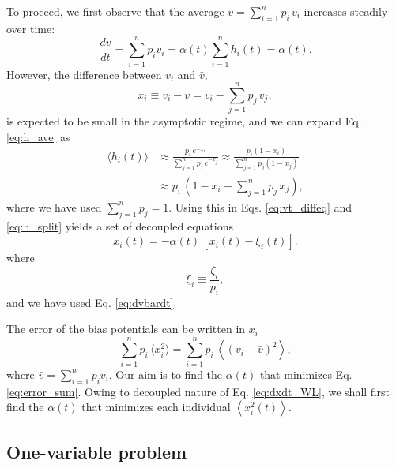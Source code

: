 \documentclass[reprint]{revtex4-1}
\begin{document}
To proceed, we first observe that
the average $\bar v = \sum_{i = 1}^n p_i \, v_i$
increases steadily over time:
%
\begin{equation}
\frac{ d \bar v } { d t }
=
\sum_{i = 1}^n p_i \dot v_i
=
\alpha(t) \sum_{i = 1}^n h_i(t) = \alpha(t).
\label{eq:dvbardt}
\end{equation}
%
However, the difference between $v_i$ and $\bar v$,
%
\begin{equation}
  x_i \equiv v_i - \bar v = v_i - \sum_{j = 1}^n p_j \, v_j,
  \label{eq:x_def}
\end{equation}
%
is expected to be small in the asymptotic regime,
and we can expand Eq. \eqref{eq:h_ave} as
$$
\begin{aligned}
\langle h_i(t) \rangle
&\approx
\frac{ p_i \, e^{- x_i} }
{ \sum_{ j = 1}^n p_j \, e^{- x_j} }
\approx
\frac{ p_i ( 1 - x_i ) }
{ \sum_{ j = 1}^n p_j (1 - x_j) }
\\
&\approx
p_i \, \left(
  1 - x_i + \sum_{j=1}^n p_j \, x_j
\right),
\end{aligned}
$$
where we have used $\sum_{j=1}^n p_j = 1$.
%
Using this in Eqs. \eqref{eq:vt_diffeq}
and \eqref{eq:h_split} yields
a set of decoupled equations
%
\begin{equation}
  \dot x_i(t)
  =
  -\alpha(t) \, \left[ x_i(t) - \xi_i(t) \right].
  \label{eq:dxdt_WL}
\end{equation}
%
where
%
\begin{equation}
  \xi_i \equiv \frac{ \zeta_i } { p_i },
  \label{eq:xi_def}
\end{equation}
and we have used Eq. \eqref{eq:dvbardt}.

The error of the bias potentials can be written in $x_i$
\begin{equation}
\sum_{i = 1}^n p_i \, \langle x_i^2 \rangle
=
\sum_{i = 1}^n p_i \, \left\langle (v_i - \bar v)^2 \right\rangle,
\label{eq:error_sum}
\end{equation}
where
$\bar v = \sum_{i = 1}^n p_i v_i$.
%
Our aim is to find the $\alpha(t)$
that minimizes Eq. \eqref{eq:error_sum}.
%
Owing to decoupled nature of Eq. \eqref{eq:dxdt_WL},
we shall first find the $\alpha(t)$ that
minimizes each individual
$\left\langle x_i^2(t) \right\rangle$.



\subsection{One-variable problem}
\end{document}
